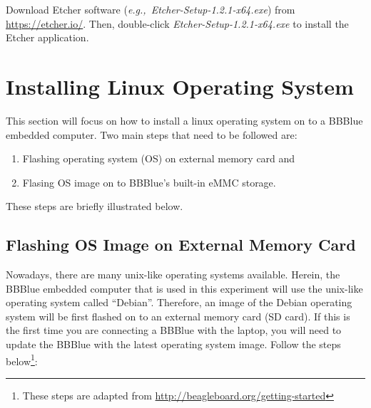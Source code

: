 \begin{mdframed}[frametitle=Download and installation, backgroundcolor=yellow!5, roundcorner=7pt,outerlinecolor= blue!70!black,outerlinewidth=1.2]
  Download Etcher software (\textit{e.g.,}~\emph{Etcher-Setup-1.2.1-x64.exe}) from
  \url{https://etcher.io/}. Then, double-click \emph{Etcher-Setup-1.2.1-x64.exe}
  to install the Etcher application.
\end{mdframed}




\section{Installing Linux Operating System}
This section will focus on how to install a linux operating system on to a
BBBlue embedded computer. Two main steps that need to be followed are: %
%
\begin{enumerate}
    \item Flashing operating system (OS) on external memory card and 
    \item Flasing OS image on to BBBlue's built-in eMMC storage.
\end{enumerate}
%
These steps are briefly illustrated below. 
\subsection{Flashing OS Image on External Memory Card}
\label{sec:flashingOS}

Nowadays, there are many unix-like operating systems available. Herein, the
BBBlue embedded computer that is used in this experiment will use the unix-like
operating system called ``Debian''. Therefore, an image of the Debian operating
system will be first flashed on to an external memory card (SD card). If this is the
first time you are connecting a BBBlue with the laptop, you will need to update
the BBBlue with the latest operating system image. Follow the steps
below\footnote{These steps are adapted from
  \url{http://beagleboard.org/getting-started}}:

